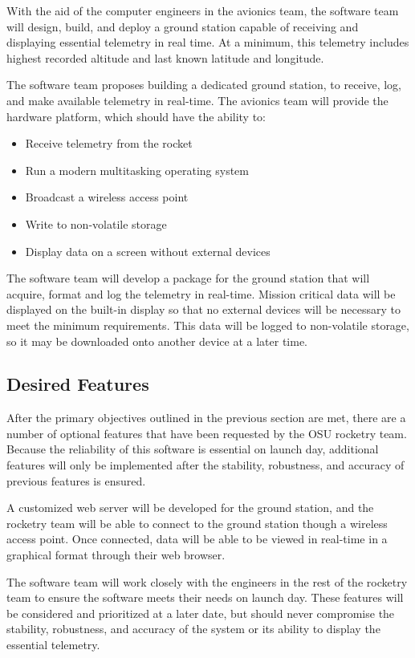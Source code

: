 \documentclass[10pt,journal,draftclsnofoot,onecolumn]{IEEEtran}
\begin{document}
	With the aid of the computer engineers in the avionics team,
	the software team will design, build, and deploy a ground station
	capable of receiving and displaying essential telemetry in real time.
	At a minimum, this telemetry includes highest recorded altitude and
	last known latitude and longitude.

	The software team proposes building a dedicated ground station,
	to receive, log, and make available telemetry in real-time.
	The avionics team will provide the hardware platform, which should
	have the ability to:

	\begin{itemize}
	\item Receive telemetry from the rocket
	\item Run a modern multitasking operating system
	\item Broadcast a wireless access point
	\item Write to non-volatile storage
	\item Display data on a screen without external devices
	\end{itemize}

	The software team will develop a package for the ground station that
	will acquire, format and log the telemetry in real-time.
	Mission critical data will be displayed on the built-in display so that
	no external devices will be necessary to meet the minimum requirements.
	This data will be logged to non-volatile storage, so it may be
	downloaded onto another device at a later time.
	
	\subsection{Desired Features}

	After the primary objectives outlined in the previous section
	are met, there are a number of optional features
	that have been requested by the \ac{OSU} rocketry team.
	Because the reliability of this software is essential on launch day,
	additional features will only be implemented after
	the stability, robustness, and accuracy of previous features
	is ensured.

	A customized web server will be developed for the ground station,
	and the rocketry team will be able to connect to the ground station
	though a wireless access point. Once connected, data will be able
	to be viewed in real-time in a graphical format through their
	web browser.

	The software team will work closely with the engineers in the
	rest of the rocketry team to ensure the software
	meets their needs on launch day. These features will be considered
	and prioritized at a later date, but should never compromise the stability,
	robustness, and accuracy of the system or its ability
	to display the essential telemetry.
	
\end{document}
